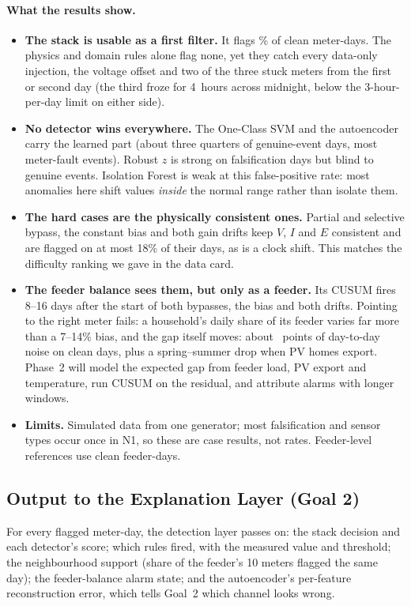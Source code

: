 \documentclass[11pt,a4paper]{article}
\begin{document}
\paragraph{What the results show.}
\begin{itemize}[leftmargin=*,itemsep=2pt]
  \item \textbf{The stack is usable as a first filter.} It flags \stackFPR\% of clean meter-days. The physics
        and domain rules alone flag none, yet they catch every data-only injection, the voltage offset and two of
        the three stuck meters from the first or second day (the third froze for 4~hours across midnight,
        below the 3-hour-per-day limit on either side).
  \item \textbf{No detector wins everywhere.} The One-Class SVM and the autoencoder carry the learned part
        (about three quarters of genuine-event days, most meter-fault events). Robust $z$ is strong on
        falsification days but blind to genuine events. Isolation Forest is weak at this false-positive rate:
        most anomalies here shift values \emph{inside} the normal range rather than isolate them.
  \item \textbf{The hard cases are the physically consistent ones.} Partial and selective bypass, the
        constant bias and both gain drifts keep $V$, $I$ and $E$ consistent and are flagged on at most 18\% of
        their days, as is a clock shift. This matches the difficulty ranking we gave in the data card.
  \item \textbf{The feeder balance sees them, but only as a feeder.} Its CUSUM fires 8--16 days after the start
        of both bypasses, the bias and both drifts. Pointing to the right meter fails: a household's daily
        share of its feeder varies far more than a 7--14\% bias, and the gap itself moves: about \gapSd{}~points of
        day-to-day noise on clean days, plus a spring--summer drop when PV homes export. Phase~2 will model
        the expected gap from feeder load, PV export and temperature, run CUSUM on the residual, and attribute
        alarms with longer windows.
  \item \textbf{Limits.} Simulated data from one generator; most falsification and sensor types occur once in
        N1, so these are case results, not rates. Feeder-level references use clean feeder-days.
\end{itemize}

\subsection{Output to the Explanation Layer (Goal 2)}
For every flagged meter-day, the detection layer passes on: the stack decision and each detector's score; which rules
fired, with the measured value and threshold; the neighbourhood support (share of the feeder's 10 meters flagged
the same day); the feeder-balance alarm state; and the autoencoder's per-feature reconstruction error, which
tells Goal~2 which channel looks wrong.
\end{document}
